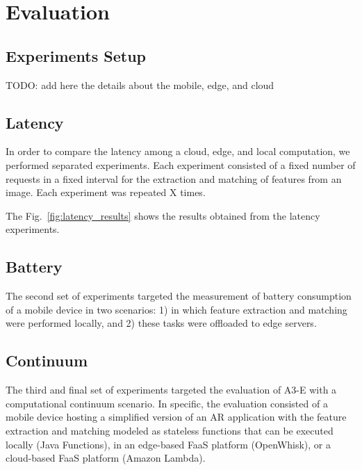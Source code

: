 \section{Evaluation}\label{sec:evaluation}



\subsection{Experiments Setup}



TODO: add here the details about the mobile, edge, and cloud

\subsection{Latency} In order to compare the latency among a cloud, edge, and local computation, we performed separated experiments. Each experiment consisted of a fixed number of requests in a fixed interval for the extraction and matching of features from an image. Each experiment was repeated X times.


The Fig.~\ref{fig:latency_results} shows the results obtained from the latency experiments. 


\subsection{Battery} The second set of experiments targeted the measurement of battery consumption of a mobile device in two scenarios: 1) in which feature extraction and matching were performed locally, and 2) these tasks were offloaded to edge servers.

\subsection{Continuum} The third and final set of experiments targeted the evaluation of A3-E with a computational continuum scenario. In specific, the evaluation consisted of a mobile device hosting a simplified version of an AR application with the feature extraction and matching modeled as stateless functions that can be executed locally (Java Functions), in an edge-based FaaS platform (OpenWhisk), or a cloud-based FaaS platform (Amazon Lambda).